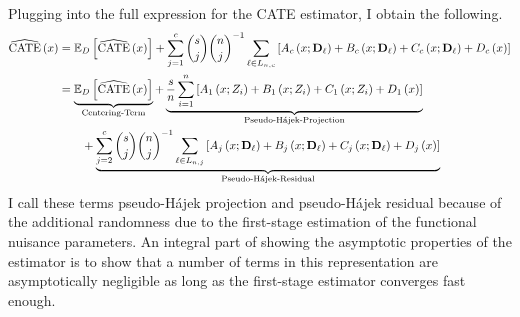 Plugging into the full expression for the CATE estimator, I obtain the following.
\begin{equation}\label{eq:DNNDML2_Decomp}
    \begin{aligned}
        \widehat{\operatorname{CATE}}\left(x\right)
        & = \mathbb{E}_{D}\left[\widehat{\operatorname{CATE}}\left(x\right)\right] 
        + \sum_{j = 1}^{c} \binom{s}{j} \binom{n}{j}^{-1}\sum_{\ell \in L_{n,c}} \left[A_{c}\left(x; \mathbf{D}_{\ell}\right) + B_{c}\left(x; \mathbf{D}_{\ell}\right) + C_{c}\left(x; \mathbf{D}_{\ell}\right) + D_{c}\left(x\right)\right]\\
        & = \underbrace{\mathbb{E}_{D}\left[\widehat{\operatorname{CATE}}\left(x\right)\right]}_{\text{Centering-Term}}
        + \underbrace{\frac{s}{n} \sum_{i = 1}^{n} \left[A_{1}\left(x; Z_{i}\right) + B_{1}\left(x; Z_{i}\right) + C_{1}\left(x; Z_{i}\right) + D_{1}\left(x\right)\right]}_{\text{Pseudo-H\'ajek-Projection}}\\
        & \quad \quad + \underbrace{\sum_{j = 2}^{c} \binom{s}{j} \binom{n}{j}^{-1}\sum_{\ell \in L_{n,j}} \left[A_{j}\left(x; \mathbf{D}_{\ell}\right) + B_{j}\left(x; \mathbf{D}_{\ell}\right) + C_{j}\left(x; \mathbf{D}_{\ell}\right) + D_{j}\left(x\right)\right]}_{\text{Pseudo-H\'ajek-Residual}}\\
    \end{aligned}
\end{equation}
I call these terms pseudo-H\'ajek projection and pseudo-H\'ajek residual because of the additional randomness due to the first-stage estimation of the functional nuisance parameters.
An integral part of showing the asymptotic properties of the estimator is to show that a number of terms in this representation are asymptotically negligible as long as the first-stage estimator converges fast enough.
